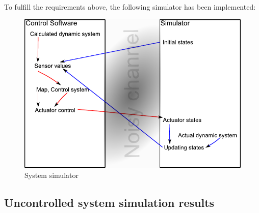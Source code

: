 To fulfill the requirements above, the following simulator has been implemented:

\begin{figure}[H]
	\centering
	\includegraphics[width=\textwidth]{img/simulator}
	\caption{System simulator}
	\label{fig:simulator}
\end{figure}

\subsection{Uncontrolled system simulation results}
